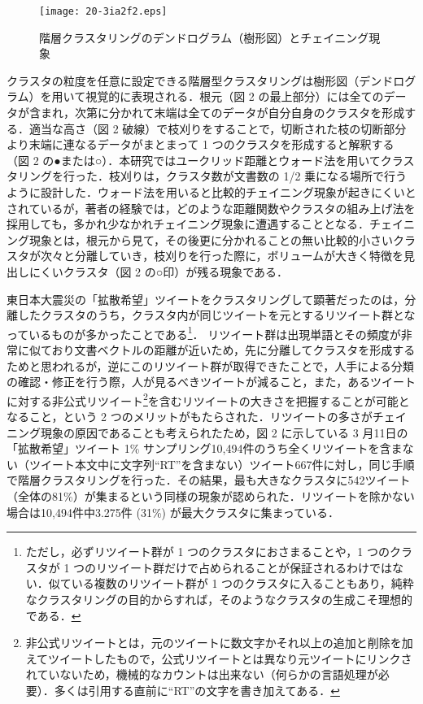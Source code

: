 \documentclass[japanese]{jnlp_1.4}
\begin{document}
\begin{figure}[b]
\texttt{[image: 20-3ia2f2.eps]}
\caption{階層クラスタリングのデンドログラム（樹形図）とチェイニング現象}
\end{figure}

クラスタの粒度を任意に設定できる階層型クラスタリングは樹形図（デンドログラム）を用いて視覚的に表現される．根元（図 2 の最上部分）には全てのデータが含まれ，次第に分かれて末端は全てのデータが自分自身のクラスタを形成する．適当な高さ（図 2 破線）で枝刈りをすることで，切断された枝の切断部分より末端に連なるデータがまとまって 1 つのクラスタを形成すると解釈する（図 2 の●または○）．本研究ではユークリッド距離とウォード法を用いてクラスタリングを行った．枝刈りは，クラスタ数が文書数の 1/2 乗になる場所で行うように設計した．ウォード法を用いると比較的チェイニング現象が起きにくいとされているが，著者の経験では，どのような距離関数やクラスタの組み上げ法を採用しても，多かれ少なかれチェイニング現象に遭遇することとなる．チェイニング現象とは，根元から見て，その後更に分かれることの無い比較的小さいクラスタが次々と分離していき，枝刈りを行った際に，ボリュームが大きく特徴を見出しにくいクラスタ（図 2 の○印）が残る現象である．

東日本大震災の「拡散希望」ツイートをクラスタリングして顕著だったのは，分離したクラスタのうち，クラスタ内が同じツイートを元とするリツイート群となっているものが多かったことである\footnote{ただし，必ずリツイート群が 1 つのクラスタにおさまることや，1 つのクラスタが 1 つのリツイート群だけで占められることが保証されるわけではない．似ている複数のリツイート群が 1 つのクラスタに入ることもあり，純粋なクラスタリングの目的からすれば，そのようなクラスタの生成こそ理想的である．}．
リツイート群は出現単語とその頻度が非常に似ており文書ベクトルの距離が近いため，先に分離してクラスタを形成するためと思われるが，逆にこのリツイート群が取得できたことで，人手による分類の確認・修正を行う際，人が見るべきツイートが減ること，また，あるツイートに対する非公式リツイート\footnote{ 
非公式リツイートとは，元のツイートに数文字かそれ以上の追加と削除を加えてツイートしたもので，公式リツイートとは異なり元ツイートにリンクされていないため，機械的なカウントは出来ない（何らかの言語処理が必要）．多くは引用する直前に``RT''の文字を書き加えてある．}を含むリツイートの大きさを把握することが可能となること，という 2 つのメリットがもたらされた．リツイートの多さがチェイニング現象の原因であることも考えられたため，図 2 に示している 3 月11日の「拡散希望」ツイート 1\% サンプリング10,494件のうち全くリツイートを含まない（ツイート本文中に文字列``RT''を含まない）ツイート667件に対し，同じ手順で階層クラスタリングを行った．その結果，最も大きなクラスタに542ツイート（全体の81\%）が集まるという同様の現象が認められた．リツイートを除かない場合は10,494件中3.275件 (31\%) が最大クラスタに集まっている．
\end{document}
